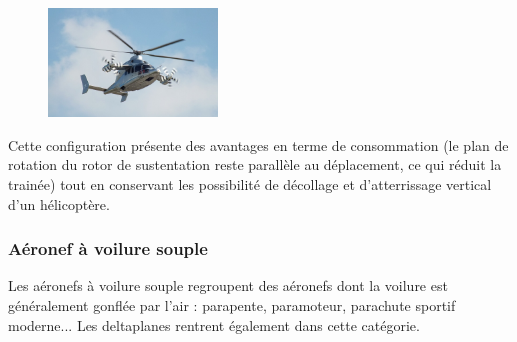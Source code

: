	\begin{figure}[H]
  	\centering
    \includegraphics[width=0.4\textwidth]{01-EtudeAeronefs/img/Eurocopter-X3.jpg}
	\end{figure}
	
	Cette configuration présente des avantages en terme de consommation (le plan de rotation du rotor de sustentation reste parallèle au déplacement, ce qui réduit la trainée) tout en conservant les possibilité de décollage et d'atterrissage vertical d'un hélicoptère.
		
	\subsubsection{Aéronef à voilure souple}
	Les aéronefs à voilure souple  regroupent des aéronefs dont la voilure est généralement gonflée par l'air : parapente, paramoteur, parachute sportif moderne... Les deltaplanes rentrent également dans cette catégorie.
	
	

